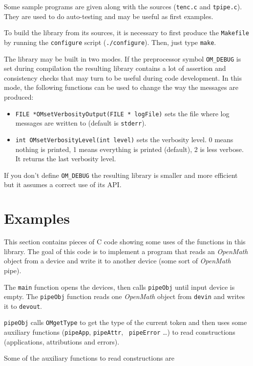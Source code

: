 \documentclass{article}
\newcommand{\OM}{{\sl OpenMath}}
\begin{document}
Some sample programs are given along with the sources ({\tt tenc.c} and 
{\tt tpipe.c}). They are used to do auto-testing and may be useful as first
examples. 

To build the library from its sources, it is necessary to first produce the 
{\tt Makefile} by running the {\tt configure} script ({\tt ./configure}).
Then, just type {\tt make}. 

The library may be built in two modes. If the preprocessor symbol
\verb+OM_DEBUG+ is set during compilation the resulting library contains a
lot of assertion and consistency checks that may turn to be useful during
code development. In this mode, the following functions can be used to change
the way the messages are produced:
\begin{itemize} 
\item \verb+FILE *OMsetVerbosityOutput(FILE * logFile)+ sets the file where 
log messages are written to (default is {\tt stderr}).
\item \verb+int OMsetVerbosityLevel(int level)+ sets the verbosity level. 
0 means nothing is printed, 1 means everything is printed (default), 2 is
less verbose. It returns the last verbosity level.
\end{itemize} 
If you  don't define \verb+OM_DEBUG+ the resulting library is smaller and
more efficient but it assumes a correct use of its API.

\section{Examples}

This section contains pieces of C code showing some uses of the functions in
this library. The goal of this code is to implement a program that reads an
{\OM} object from a device and write it to another device (some sort of {\OM}
pipe). 

The {\tt main} function opens the devices, then calls {\tt pipeObj} until input device is empty. The {\tt pipeObj} function reads one {\OM} object from 
{\tt devin} and writes it to {\tt devout}.


{\tt pipeObj} calls {\tt OMgetType} to get the type of the current token and
then uses some auxiliary functions ({\tt pipeApp}, {\tt pipeAttr}, {\tt
pipeError} \ldots ) to read constructions (applications,
attributions and errors).

Some of the auxiliary functions to read constructions are
\end{document}
